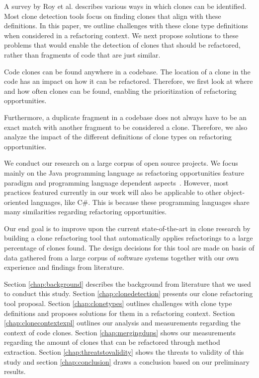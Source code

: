 \documentclass[a4paper]{article}
\begin{document}
A survey by Roy et al. \cite{roy2007survey} describes various ways in which clones can be identified. Most clone detection tools focus on finding clones that align with these definitions. In this paper, we outline challenges with these clone type definitions when considered in a refactoring context. We next propose solutions to these problems that would enable the detection of clones that should be refactored, rather than fragments of code that are just similar.

Code clones can be found anywhere in a codebase. The location of a clone in the code has an impact on how it can be refactored. Therefore, we first look at where and how often clones can be found, enabling the prioritization of refactoring opportunities.

Furthermore, a duplicate fragment in a codebase does not always have to be an exact match with another fragment to be considered a clone. Therefore, we also analyze the impact of the different definitions of clone types on refactoring opportunities.

We conduct our research on a large corpus of open source projects. We focus mainly on the Java programming language as refactoring opportunities feature paradigm and programming language dependent aspects~\cite{choi2011extracting}. However, most practices featured currently in our work will also be applicable to other object-oriented languages, like C\#. This is because these programming languages share many similarities regarding refactoring opportunities.

Our end goal is to improve upon the current state-of-the-art in clone research \cite{fontana2015duplicated, alwaqfi2017refactoring} by building a clone refactoring tool that automatically applies refactorings to a large percentage of clones found. The design decisions for this tool are made on basis of data gathered from a large corpus of software systems together with our own experience and findings from literature.

Section \ref{chap:background} describes the background from literature that we used to conduct this study. Section \ref{chap:clonedetection} presents our clone refactoring tool proposal. Section \ref{chap:clonetypes} outlines challenges with clone type definitions and proposes solutions for them in a refactoring context. Section \ref{chap:clonecontextexpl} outlines our analysis and measurements regarding the context of code clones. Section \ref{chap:mergingdups} shows our measurements regarding the amount of clones that can be refactored through method extraction. Section \ref{chap:threatstovalidity} shows the threats to validity of this study and section \ref{chap:conclusion} draws a conclusion based on our preliminary results.
\end{document}

